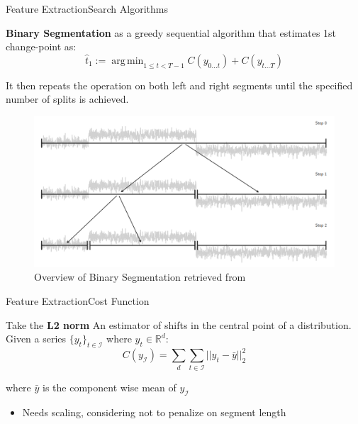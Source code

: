 \documentclass{beamer}
\DeclareMathOperator*{\argmin}{arg\,min}
\begin{document}
            \begin{frame}{Feature Extraction}{Search Algorithms}

                \textbf{Binary Segmentation} as a greedy sequential algorithm that estimates 1st change-point as:
                \begin{equation}
                    \hat{t}_{1} := \argmin_{1 \leq t < T - 1} C(y_{0 \dots t}) + C(y_{t \dots T})
                \end{equation}

                It then repeats the operation on both left and right segments until the specified number of splits is achieved.

                \begin{figure}[!htbp]
                    \centering
                    \includegraphics[scale=0.3]{bin_seg_schematics.png}
                    \caption{Overview of Binary Segmentation retrieved from \cite{truong2020selective}}
                \end{figure}
            \end{frame}

            \begin{frame}{Feature Extraction}{Cost Function}

                Take the \textbf{L2 norm} An estimator of shifts in the central point of a distribution. Given a series $\{y_t\}_{t \in \mathcal{I}}$ where  $y_t \in \mathbb{R}^d$:
                \begin{equation}
                    C(y_{\mathcal{I}}) = \sum_{d} \sum_{t \in \mathcal{I}} ||y_t - \bar{y} ||_{2}^{2}
                \end{equation}

                where $\bar{y}$ is the component wise mean of $y_{\mathcal{I}}$

                \begin{itemize}
                    \item Needs scaling, considering not to penalize on segment length
                \end{itemize}

            \end{frame}
\end{document}
